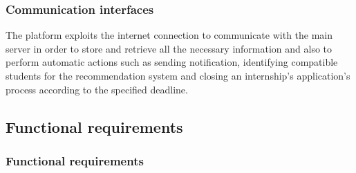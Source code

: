 \documentclass[11pt,twoside]{article}
\begin{document}
		\subsubsection{Communication interfaces}
The platform exploits the internet connection to communicate with the main server in order to store and retrieve all the necessary information and also to perform automatic actions such as sending notification, identifying compatible students for the recommendation system and closing an internship's application's process according to the specified deadline.

	\subsection{Functional requirements}
		\subsubsection{Functional requirements}
\end{document}
